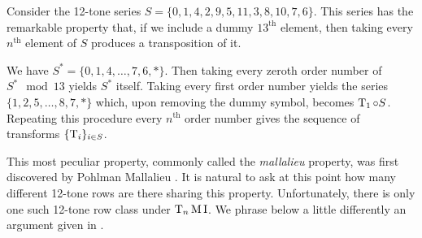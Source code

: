 Consider the 12-tone series $S = \{ 0, 1, 4, 2, 9, 5, 11, 3, 8, 10, 7, 6 \}$. This series
has the remarkable property that, if we include a dummy $13^\text{th}$ element, then
taking every $n^\text{th}$ element of $S$ produces a transposition of it.

\begin{example}
	We have $S^* = \{ 0, 1, 4, \dots, 7, 6, * \}$. Then taking every zeroth order number of
	$S^* \mod 13$ yields $S^*$ itself. Taking every first order number yields the series
	$\{ 1, 2, 5, \dots, 8, 7, * \}$ which, upon removing the dummy symbol, becomes
	$\operatorname{T}_1 \circ S$. Repeating this procedure every $n^\text{th}$ order number gives the
	sequence of transforms $\{ \operatorname{T}_i \}_{i \in S}$.
\end{example}

This most peculiar property, commonly called the \emph{mallalieu} property, was first discovered by Pohlman Mallalieu \cite[285]{Lewin1966}.
It is natural to ask at this point how many different 12-tone rows are there sharing
this property. Unfortunately, there is only one such 12-tone row class under $\operatorname{T}_n\operatorname{M}\operatorname{I}$.
We phrase below a little differently an argument given in \cite[17]{Morris1976}.
